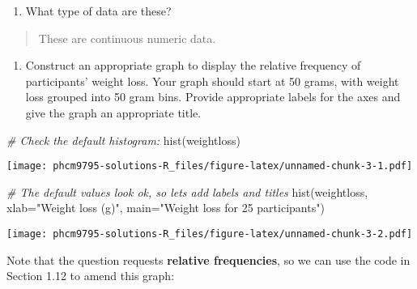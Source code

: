 \documentclass[
]{memoir}
\newenvironment{Shaded}{\begin{snugshade}}{\end{snugshade}}
\newcommand{\AttributeTok}[1]{\textcolor[rgb]{0.77,0.63,0.00}{#1}}
\newcommand{\CommentTok}[1]{\textcolor[rgb]{0.56,0.35,0.01}{\textit{#1}}}
\newcommand{\ConstantTok}[1]{\textcolor[rgb]{0.00,0.00,0.00}{#1}}
\newcommand{\DecValTok}[1]{\textcolor[rgb]{0.00,0.00,0.81}{#1}}
\newcommand{\FunctionTok}[1]{\textcolor[rgb]{0.00,0.00,0.00}{#1}}
\newcommand{\NormalTok}[1]{#1}
\newcommand{\OtherTok}[1]{\textcolor[rgb]{0.56,0.35,0.01}{#1}}
\newcommand{\SpecialCharTok}[1]{\textcolor[rgb]{0.00,0.00,0.00}{#1}}
\newcommand{\StringTok}[1]{\textcolor[rgb]{0.31,0.60,0.02}{#1}}
\providecommand{\tightlist}{%
  \setlength{\itemsep}{0pt}\setlength{\parskip}{0pt}}
\begin{document}
\begin{enumerate}
\def\labelenumi{\alph{enumi})}
\setcounter{enumi}{1}
\tightlist
\item
  What type of data are these?
\end{enumerate}

\begin{quote}
These are continuous numeric data.
\end{quote}

\begin{enumerate}
\def\labelenumi{\alph{enumi})}
\setcounter{enumi}{2}
\tightlist
\item
  Construct an appropriate graph to display the relative frequency of participants' weight loss. Your graph should start at 50 grams, with weight loss grouped into 50 gram bins. Provide appropriate labels for the axes and give the graph an appropriate title.
\end{enumerate}

\begin{Shaded}
\begin{Highlighting}[]
\CommentTok{\# Check the default histogram:}
\FunctionTok{hist}\NormalTok{(weightloss)}
\end{Highlighting}
\end{Shaded}

\texttt{[image: phcm9795-solutions-R\_files/figure-latex/unnamed-chunk-3-1.pdf]}

\begin{Shaded}
\begin{Highlighting}[]
\CommentTok{\# The default values look ok, so let\textquotesingle{}s add labels and titles}
\FunctionTok{hist}\NormalTok{(weightloss, }\AttributeTok{xlab=}\StringTok{"Weight loss (g)"}\NormalTok{, }\AttributeTok{main=}\StringTok{"Weight loss for 25 participants"}\NormalTok{)}
\end{Highlighting}
\end{Shaded}

\texttt{[image: phcm9795-solutions-R\_files/figure-latex/unnamed-chunk-3-2.pdf]}

Note that the question requests \textbf{relative frequencies}, so we can use the code in Section 1.12 to amend this graph:

\begin{Shaded}
\end{Shaded}
\end{document}
